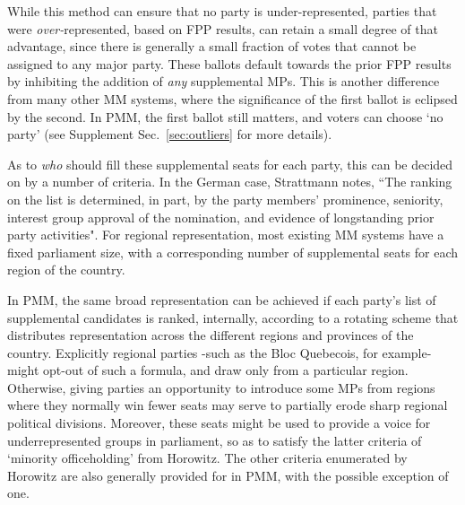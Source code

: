 While this method can ensure that no party is under-represented, parties that were \emph{over-}represented, based on FPP results, can retain a small degree of that advantage, since there is generally a small fraction of votes that cannot be assigned to any major party. These ballots default towards the prior FPP results by inhibiting the addition of \emph{any} supplemental MPs.
This is another difference from many other MM systems, where the significance of the first ballot is eclipsed by the second. In PMM, the first ballot still matters, and voters can choose `no party' (see Supplement Sec.~\ref{sec:outliers} for more details).

As to \emph{who} should fill these supplemental seats for each party, this can be decided on by a number of criteria.
In the German case, Strattmann notes\cite{Stratmann}, ``The ranking on the list is determined, in part, by the party members' prominence, seniority, interest group approval of the nomination, and evidence of longstanding prior party activities".
For regional representation, most existing MM systems have a fixed parliament size, with a corresponding number of supplemental seats for each region of the country.

In PMM, the same broad representation can be achieved if each party's list of supplemental candidates is ranked, internally, according to a rotating scheme that distributes representation across the different regions and provinces of the country.
Explicitly regional parties \--such as the Bloc Quebecois, for example\-- might opt-out of such a formula, and draw only from a particular region.
Otherwise, giving parties an opportunity to introduce some MPs from regions where they normally win fewer seats may serve to partially erode sharp regional political divisions.
Moreover, these seats might be used to provide a voice for underrepresented groups in parliament, so as to satisfy the latter
criteria of `minority officeholding' from Horowitz\cite{horowitz}. The other criteria enumerated by Horowitz are also generally provided for in PMM, with the possible exception of one.

